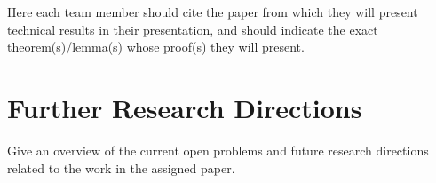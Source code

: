 \documentclass[paper=a4, fontsize=11pt]{scrartcl} %
\numberwithin{equation}{section} %
\numberwithin{figure}{section} %
\numberwithin{table}{section} %
\begin{document}
Here each team member should cite the paper from which they will present technical results in their
presentation, and should indicate the exact theorem(s)/lemma(s) whose proof(s) they will present.


\section{Further Research Directions}
Give an overview of the current open problems and future research directions related to the work in the assigned paper.






\end{document}
